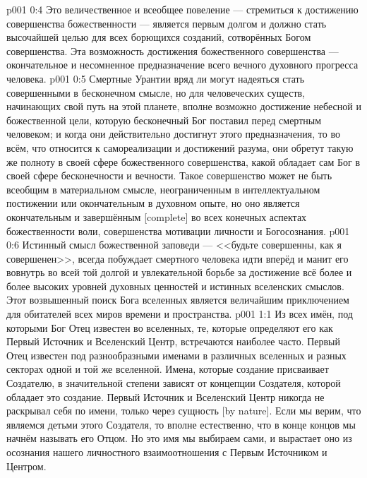 \vs p001 0:4 Это величественное и всеобщее повеление --- стремиться к достижению совершенства божественности --- является первым долгом и должно стать высочайшей целью для всех борющихся созданий, сотворённых Богом совершенства. Эта возможность достижения божественного совершенства --- окончательное и несомненное предназначение всего вечного духовного прогресса человека.
\vs p001 0:5 Смертные Урантии вряд ли могут надеяться стать совершенными в бесконечном смысле, но для человеческих существ, начинающих свой путь на этой планете, вполне возможно достижение небесной и божественной цели, которую бесконечный Бог поставил перед смертным человеком; и когда они действительно достигнут этого предназначения, то во всём, что относится к самореализации и достижений разума, они обретут такую же полноту в своей сфере божественного совершенства, какой обладает сам Бог в своей сфере бесконечности и вечности. Такое совершенство может не быть всеобщим в материальном смысле, неограниченным в интеллектуальном постижении или окончательным в духовном опыте, но оно является окончательным и завершённым [complete] во всех конечных аспектах божественности воли, совершенства мотивации личности и Богосознания.
\vs p001 0:6 Истинный смысл божественной заповеди --- <<будьте совершенны, как я совершенен>>, всегда побуждает смертного человека идти вперёд и манит его вовнутрь во всей той долгой и увлекательной борьбе за достижение всё более и более высоких уровней духовных ценностей и истинных вселенских смыслов. Этот возвышенный поиск Бога вселенных является величайшим приключением для обитателей всех миров времени и пространства.
\vs p001 1:1 Из всех имён, под которыми Бог Отец известен во вселенных, те, которые определяют его как Первый Источник и Вселенский Центр, встречаются наиболее часто. Первый Отец известен под разнообразными именами в различных вселенных и разных секторах одной и той же вселенной. Имена, которые создание присваивает Создателю, в значительной степени зависят от концепции Создателя, которой обладает это создание. Первый Источник и Вселенский Центр никогда не раскрывал себя по имени, только через сущность [by nature]. Если мы верим, что являемся детьми этого Создателя, то вполне естественно, что в конце концов мы начнём называть его Отцом. Но это имя мы выбираем сами, и вырастает оно из осознания нашего личностного взаимоотношения с Первым Источником и Центром.
